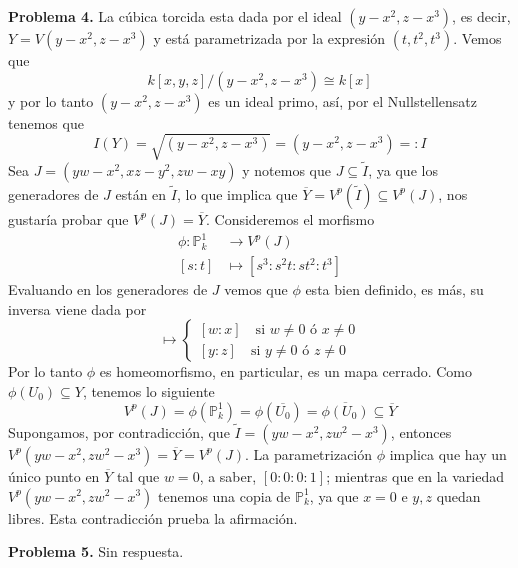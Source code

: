 \documentclass{article}
\def \P {\mathbb{P}}
\begin{document}
\vspace{5mm}
\noindent\textbf{Problema 4.} La cúbica torcida esta dada por el ideal $(y-x^{2},z-x^{3})$, es 
decir, $Y=V(y-x^{2},z-x^{3})$ y está parametrizada por la expresión $(t,t^{2},t^{3})$. Vemos que
\begin{equation*}
    k[x,y,z]/(y-x^{2},z-x^{3})\cong k[x]
\end{equation*}
y por lo tanto $(y-x^{2},z-x^{3})$ es un ideal primo, así, por el Nullstellensatz tenemos que
\begin{equation*}
    I(Y)=\sqrt{(y-x^{2},z-x^{3})}=(y-x^{2},z-x^{3})=:I
\end{equation*}
Sea $J=(yw-x^{2},xz-y^{2},zw-xy)$ y notemos que $J\subseteq\widetilde{I}$, ya que los generadores 
de $J$ están en $\widetilde{I}$, lo que implica que 
$\overline{Y}=V^{p}(\widetilde{I})\subseteq V^{p}(J)$, nos gustaría probar que 
$V^{p}(J)=\overline{Y}$. Consideremos el morfismo
\begin{align*}
    \phi:\P_{k}^{1} &\to V^{p}(J) \\
    [s:t] &\mapsto [s^{3}:s^{2}t:st^{2}:t^{3}]
\end{align*}
Evaluando en los generadores de $J$ vemos que $\phi$ esta bien definido, es más, su inversa viene 
dada por
\begin{equation*}
    [w:x:y:z]\mapsto\begin{cases}
        [w:x] \quad \text{si $w\neq0$ ó $x\neq0$} \\
        [y:z] \quad \text{si $y\neq0$ ó $z\neq0$}
    \end{cases}
\end{equation*}
Por lo tanto $\phi$ es homeomorfismo, en particular, es un mapa cerrado. Como 
$\phi(U_{0})\subseteq Y$, tenemos lo siguiente
\begin{equation*}
    V^{p}(J)=\phi(\P_{k}^{1})=\phi(\overline{U_{0}})=\overline{\phi(U_{0})}\subseteq\overline{Y}
\end{equation*}
Supongamos, por contradicción, que $\widetilde{I}=(yw-x^{2},zw^{2}-x^{3})$, entonces 
$V^{p}(yw-x^{2},zw^{2}-x^{3})=\overline{Y}=V^{p}(J)$. La parametrización $\phi$ implica que hay un 
único punto en $\overline{Y}$ tal que $w=0$, a saber, $[0:0:0:1]$; mientras que en la variedad 
$V^{p}(yw-x^{2},zw^{2}-x^{3})$ tenemos una copia de $\P_{k}^{1}$, ya que $x=0$ e $y,z$ quedan 
libres. Esta contradicción prueba la afirmación.

\vspace{5mm}
\noindent\textbf{Problema 5.} Sin respuesta.
\end{document}
